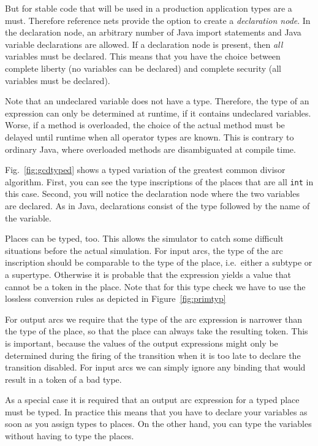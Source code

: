 But for stable code that will be used in a production application
types are a must. Therefore reference nets provide the option
to create a \emph{declaration node}. In the declaration node,
an arbitrary number of Java import statements and Java
variable declarations are allowed. If a declaration node is present,
then \emph{all} variables must be declared. This means that
you have the choice between complete liberty (no variables
can be declared) and complete security (all variables must
be declared).

Note that an undeclared variable does not have a type. Therefore,
the type of an expression can only be determined at runtime,
if it contains undeclared variables. Worse, if a method is
overloaded, the choice of the actual method must be
delayed until runtime when all operator types are known.
This is contrary to ordinary Java, where overloaded methods
are disambiguated at compile time.


Fig.~\ref{fig:gcdtyped} shows a typed variation of the greatest
common divisor algorithm. First, you can see the type inscriptions
of the places that are all \texttt{int} in this case. Second,
you will notice the declaration node where the two variables
are declared. As in Java, declarations consist of the type
followed by the name of the variable.

Places can be typed, too. This allows the
simulator to catch some difficult situations before the
actual simulation. For input arcs, the type of the arc inscription
should be comparable to the type of the place, i.e.\ either
a subtype or a supertype. Otherwise
it is probable that the expression yields a value that cannot be
a token in the place. Note that for this type check we have to use the
lossless conversion rules as depicted in Figure~\ref{fig:primtyp}

For output arcs we require that the type
of the arc expression is narrower than the type of the place, so that
the place can always take the resulting token. This is
important, because the values of the output expressions might
only be determined during the firing of the transition when it is
too late to declare the transition disabled. For input arcs we can
simply ignore any binding that would result in a token
of a bad type.

As a special case it is required that an output arc expression
for a typed place must be typed. In practice this means that you have
to declare your variables as soon as you assign types to places.
On the other hand, you can type the variables without having to type
the places.

